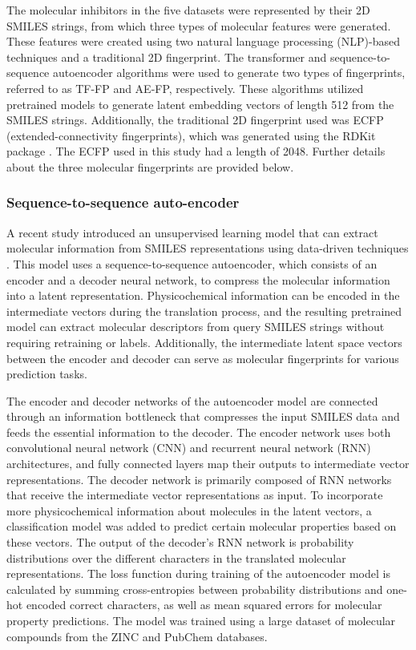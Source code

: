\documentclass[10pt]{article}
\begin{document}
		The molecular inhibitors in the five datasets were represented by their 2D SMILES strings, from which three types of molecular features were generated. These features were created using two natural language processing (NLP)-based techniques and a traditional 2D fingerprint. The transformer and sequence-to-sequence autoencoder algorithms were used to generate two types of fingerprints, referred to as TF-FP and AE-FP, respectively. These algorithms utilized pretrained models to generate latent embedding vectors of length 512 from the SMILES strings. Additionally, the traditional 2D fingerprint used was ECFP (extended-connectivity fingerprints), which was generated using the RDKit package \cite{landrum2013rdkit}. The ECFP used in this study had a length of 2048. Further details about the three molecular fingerprints are provided below.
		
		
		\subsubsection{Sequence-to-sequence auto-encoder }
		
		
		A recent study introduced an unsupervised learning model that can extract molecular information from SMILES representations using data-driven techniques \cite{winter2019learning}. This model uses a sequence-to-sequence autoencoder, which consists of an encoder and a decoder neural network, to compress the molecular information into a latent representation. Physicochemical information can be encoded in the intermediate vectors during the translation process, and the resulting pretrained model can extract molecular descriptors from query SMILES strings without requiring retraining or labels. Additionally, the intermediate latent space vectors between the encoder and decoder can serve as molecular fingerprints for various prediction tasks.
		
		The encoder and decoder networks of the autoencoder model are connected through an information bottleneck that compresses the input SMILES data and feeds the essential information to the decoder. The encoder network uses both convolutional neural network (CNN) and recurrent neural network (RNN) architectures, and fully connected layers map their outputs to intermediate vector representations. The decoder network is primarily composed of RNN networks that receive the intermediate vector representations as input. To incorporate more physicochemical information about molecules in the latent vectors, a classification model was added to predict certain molecular properties based on these vectors. The output of the decoder's RNN network is probability distributions over the different characters in the translated molecular representations. The loss function during training of the autoencoder model is calculated by summing cross-entropies between probability distributions and one-hot encoded correct characters, as well as mean squared errors for molecular property predictions. The model was trained using a large dataset of molecular compounds from the ZINC \cite{irwin2005zinc} and PubChem \cite{kim2016pubchem} databases.
		
\end{document}
